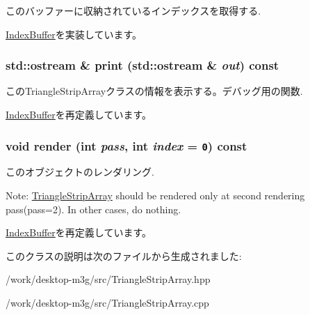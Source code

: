 このバッファーに収納されているインデックスを取得する. 

\hyperlink{classm3g_1_1IndexBuffer_59fb1eca8810ea3b028735c5dce53fca}{IndexBuffer}を実装しています。\hypertarget{classm3g_1_1TriangleStripArray_6fea17fa1532df3794f8cb39cb4f911f}{
\subsubsection[{print}]{\setlength{\rightskip}{0pt plus 5cm}std::ostream \& print (std::ostream \& {\em out}) const}}
\label{classm3g_1_1TriangleStripArray_6fea17fa1532df3794f8cb39cb4f911f}


このTriangleStripArrayクラスの情報を表示する。デバッグ用の関数. 

\hyperlink{classm3g_1_1IndexBuffer_6fea17fa1532df3794f8cb39cb4f911f}{IndexBuffer}を再定義しています。\hypertarget{classm3g_1_1TriangleStripArray_1efcb1973989d9963d5bd6d03065d389}{
\subsubsection[{render}]{\setlength{\rightskip}{0pt plus 5cm}void render (int {\em pass}, \/  int {\em index} = {\tt 0}) const}}
\label{classm3g_1_1TriangleStripArray_1efcb1973989d9963d5bd6d03065d389}


このオブジェクトのレンダリング.

Note: \hyperlink{classm3g_1_1TriangleStripArray}{TriangleStripArray} should be rendered only at second rendering pass(pass=2). In other cases, do nothing. 

\hyperlink{classm3g_1_1IndexBuffer_1efcb1973989d9963d5bd6d03065d389}{IndexBuffer}を再定義しています。

このクラスの説明は次のファイルから生成されました:\begin{CompactItemize}
\item 
/work/desktop-m3g/src/TriangleStripArray.hpp\item 
/work/desktop-m3g/src/TriangleStripArray.cpp\end{CompactItemize}
